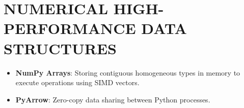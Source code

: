 \hypertarget{numerical-high-performance-data-structures}{%
\chapter{NUMERICAL HIGH-PERFORMANCE DATA
STRUCTURES}\label{numerical-high-performance-data-structures}}

\begin{itemize}
\tightlist
\item
  \textbf{NumPy Arrays}: Storing contiguous homogeneous types in memory
  to execute operations using SIMD vectors.
\item
  \textbf{PyArrow}: Zero-copy data sharing between Python processes.
\end{itemize}
